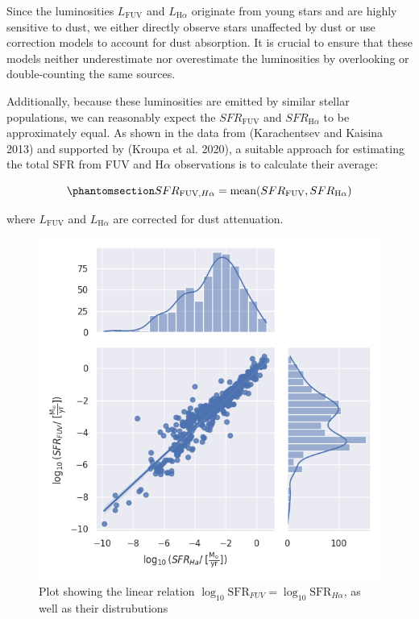 \documentclass[
]{article}
\begin{document}
Since the luminosities \(L_{\text{FUV}}\) and \(L_{\text{H}\alpha}\)
originate from young stars and are highly sensitive to dust, we either
directly observe stars unaffected by dust or use correction models to
account for dust absorption. It is crucial to ensure that these models
neither underestimate nor overestimate the luminosities by overlooking
or double-counting the same sources.

Additionally, because these luminosities are emitted by similar stellar
populations, we can reasonably expect the \(SFR_{\text{FUV}}\) and
\(SFR_{\text{H}\alpha}\) to be approximately equal. As shown in the data
from (Karachentsev and Kaisina 2013) and supported by (Kroupa et al.
2020), a suitable approach for estimating the total SFR from FUV and
H\(\alpha\) observations is to calculate their average:

\begin{equation}\phantomsection\label{eq-SFR_comb}{
SFR_{\text{FUV},H\alpha} = \text{mean}(SFR_{\text{FUV}}, SFR_{\text{H}\alpha}) 
}\end{equation}

where \(L_{\text{FUV}}\) and \(L_{\text{H}\alpha}\) are corrected for
dust attenuation.

\begin{figure}[H]

{\centering \includegraphics[width=5.20833in,height=\textheight]{figure/log_SFR_FUV_Ha.png}

}

\caption{Plot showing the linear relation
\(\log_{10}\text{SFR}_{FUV} = \log_{10}\text{SFR}_{H\alpha}\), as well
as their distrubutions}

\end{figure}%
\end{document}
